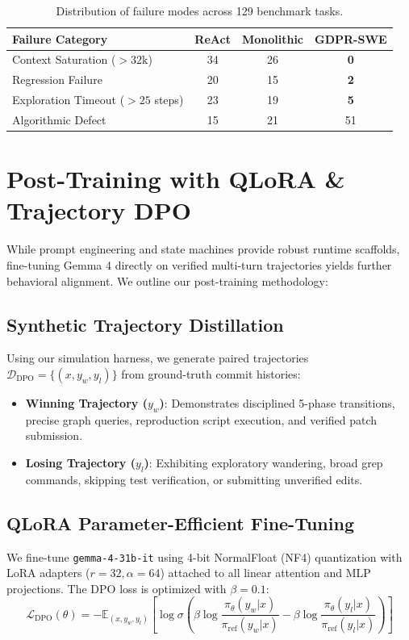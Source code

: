 \documentclass[10pt,twocolumn,letterpaper]{article}
\theoremstyle{definition}
\begin{document}
\begin{table}[h]
\centering
\small
\caption{Distribution of failure modes across 129 benchmark tasks.}
\label{tab:failures}
\begin{tabular}{lccc}
\toprule
\textbf{Failure Category} & \textbf{ReAct} & \textbf{Monolithic} & \textbf{GDPR-SWE} \\
\midrule
Context Saturation ($>32\text{k}$) & 34 & 26 & \textbf{0} \\
Regression Failure & 20 & 15 & \textbf{2} \\
Exploration Timeout ($>25$ steps) & 23 & 19 & \textbf{5} \\
Algorithmic Defect & 15 & 21 & 51 \\
\bottomrule
\end{tabular}
\end{table}

\section{Post-Training with QLoRA \& Trajectory DPO}
\label{sec:training}

While prompt engineering and state machines provide robust runtime scaffolds, fine-tuning Gemma 4 directly on verified multi-turn trajectories yields further behavioral alignment. We outline our post-training methodology:

\subsection{Synthetic Trajectory Distillation}
Using our simulation harness, we generate paired trajectories $\mathcal{D}_{\text{DPO}} = \{(x, y_w, y_l)\}$ from ground-truth commit histories:
\begin{itemize}
    \item \textbf{Winning Trajectory ($y_w$)}: Demonstrates disciplined 5-phase transitions, precise graph queries, reproduction script execution, and verified patch submission.
    \item \textbf{Losing Trajectory ($y_l$)}: Exhibiting exploratory wandering, broad grep commands, skipping test verification, or submitting unverified edits.
\end{itemize}

\subsection{QLoRA Parameter-Efficient Fine-Tuning}
We fine-tune \texttt{gemma-4-31b-it} using 4-bit NormalFloat (NF4) quantization \cite{dettmers2024qlora} with LoRA adapters ($r=32, \alpha=64$) attached to all linear attention and MLP projections. The DPO loss is optimized with $\beta=0.1$:
\begin{equation}
    \mathcal{L}_{\text{DPO}}(\theta) = -\mathbb{E}_{(x, y_w, y_l)} \left[ \log \sigma \left( \beta \log \frac{\pi_\theta(y_w|x)}{\pi_{\text{ref}}(y_w|x)} - \beta \log \frac{\pi_\theta(y_l|x)}{\pi_{\text{ref}}(y_l|x)} \right) \right]
\end{equation}
\end{document}

